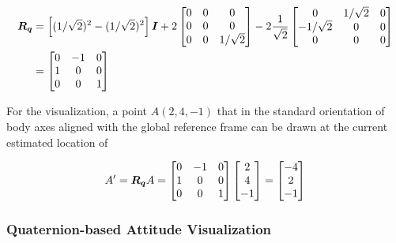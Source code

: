 \begin{equation}
  \begin{aligned}
    \boldsymbol{R_q} & = \left[ (1/\sqrt{2})^2 - (1/\sqrt{2})^2 \right] \boldsymbol{I} + 2 \begin{bmatrix} 0 & 0 & 0 \\ 0 & 0 & 0 \\ 0 & 0 & 1/\sqrt{2} \end{bmatrix} - 2 \frac{1}{\sqrt{2}} \begin{bmatrix} 0 & 1/\sqrt{2} & 0 \\ -1/\sqrt{2} & 0 & 0 \\ 0 & 0 & 0 \\ \end{bmatrix} \\
      & = \begin{bmatrix} 0 & -1 & 0 \\ 1 & 0 & 0 \\ 0 & 0 & 1 \\\end{bmatrix}
  \end{aligned}
\end{equation}

For the visualization, a point $A (2, 4, -1)$ that in the standard orientation of body axes aligned with the global reference frame can be drawn at the current estimated location of

\begin{equation}
  A' = \boldsymbol{R_q} A = \begin{bmatrix} 0 & -1 & 0 \\ 1 & 0 & 0 \\ 0 & 0 & 1 \\\end{bmatrix} \begin{bmatrix} 2 \\ 4 \\ -1 \end{bmatrix} = \begin{bmatrix} -4 \\ 2 \\ -1 \end{bmatrix}
\end{equation}

\subsubsection{Quaternion-based Attitude Visualization}
\label{subsubsec:QuaternionbasedAttitudeVisualization}



